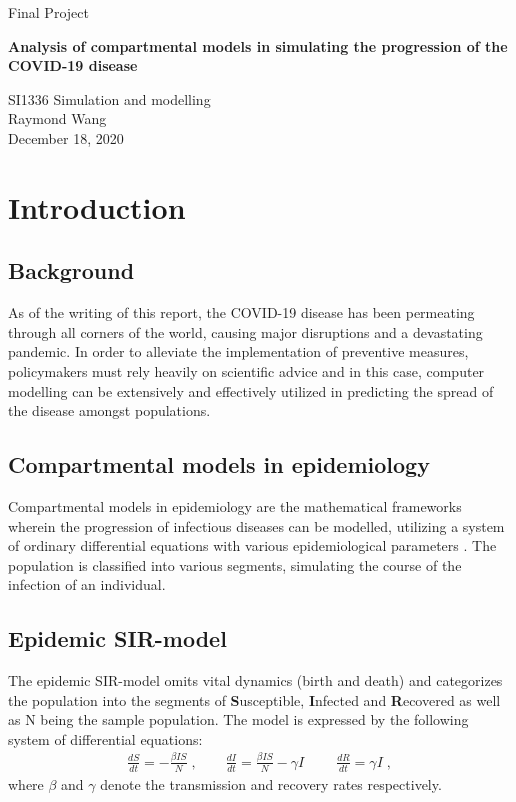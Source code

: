 \documentclass[12pt]{article}
\begin{document}
\begin{titlepage}
    \begin{center}
        \vspace*{1cm}
        \Large
        Final Project 
        
        \vspace{0.5cm}
        
        \LARGE
        \textbf{Analysis of compartmental models in simulating the progression of the COVID-19 disease}
        \vspace{0.5cm}
        
        \Large
        SI1336 Simulation and modelling \\

        \vfill 
        Raymond Wang \\
        December 18, 2020
    \end{center}
\end{titlepage}

\newpage
\large
\tableofcontents

\newpage 

\section{Introduction}
\subsection{Background}
As of the writing of this report, the COVID-19 disease has been permeating through all corners of the world, causing major disruptions and a devastating pandemic. In order to alleviate the implementation of preventive measures, policymakers must rely heavily on scientific advice and in this case, computer modelling can be extensively and effectively utilized in predicting the spread of the disease amongst populations.
\subsection{Compartmental models in epidemiology}
Compartmental models in epidemiology are the mathematical frameworks wherein the progression of infectious diseases can be modelled, utilizing a system of ordinary differential equations with various epidemiological parameters \cite{söder}. The population is classified into various segments, simulating the course of the infection of an individual.
\subsection{Epidemic SIR-model}
The epidemic SIR-model omits vital dynamics (birth and death) and categorizes the population into the segments of \textbf{S}usceptible, \textbf{I}nfected and \textbf{R}ecovered
as well as N being the sample population. The model is expressed by the following system of differential equations:
\begin{align}
\frac{dS}{dt} = - \frac{\beta I S}{N} \;, \qquad
\frac{dI}{dt} = \frac{\beta I S}{N}- \gamma I \; \qquad
\frac{dR}{dt} = \gamma I \;,
\end{align}
\noindent where $\beta$ and $\gamma$ denote the transmission and recovery rates respectively.
\end{document}

